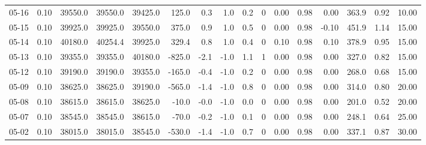 \begin{threeparttable}
{\begin{tabular}{lrrrrrrrrrrrrrrr}
  05-16 &     0.10 & 39550.0 & 39550.0 & 39425.0 &      125.0 &            0.3 &                      1.0 &                 0.2 &              0 &       0.00 &      0.98 &           0.00 &            363.9 &            0.92 &                  10.00 \\
  05-15 &     0.10 & 39925.0 & 39925.0 & 39550.0 &      375.0 &            0.9 &                      1.0 &                 0.5 &              0 &       0.00 &      0.98 &          -0.10 &            451.9 &            1.14 &                  15.00 \\
  05-14 &     0.10 & 40180.0 & 40254.4 & 39925.0 &      329.4 &            0.8 &                      1.0 &                 0.4 &              0 &       0.10 &      0.98 &           0.10 &            378.9 &            0.95 &                  15.00 \\
  05-13 &     0.10 & 39355.0 & 39355.0 & 40180.0 &     -825.0 &           -2.1 &                     -1.0 &                 1.1 &              1 &       0.00 &      0.98 &           0.00 &            327.0 &            0.82 &                  15.00 \\
  05-12 &     0.10 & 39190.0 & 39190.0 & 39355.0 &     -165.0 &           -0.4 &                     -1.0 &                 0.2 &              0 &       0.00 &      0.98 &           0.00 &            268.0 &            0.68 &                  15.00 \\
  05-09 &     0.10 & 38625.0 & 38625.0 & 39190.0 &     -565.0 &           -1.4 &                     -1.0 &                 0.8 &              0 &       0.00 &      0.98 &           0.00 &            314.0 &            0.80 &                  20.00 \\
  05-08 &     0.10 & 38615.0 & 38615.0 & 38625.0 &      -10.0 &           -0.0 &                     -1.0 &                 0.0 &              0 &       0.00 &      0.98 &           0.00 &            201.0 &            0.52 &                  20.00 \\
  05-07 &     0.10 & 38545.0 & 38545.0 & 38615.0 &      -70.0 &           -0.2 &                     -1.0 &                 0.1 &              0 &       0.00 &      0.98 &           0.00 &            248.1 &            0.64 &                  25.00 \\
  05-02 &     0.10 & 38015.0 & 38015.0 & 38545.0 &     -530.0 &           -1.4 &                     -1.0 &                 0.7 &              0 &       0.00 &      0.98 &           0.00 &            337.1 &            0.87 &                  30.00 \\

\end{tabular}}
\end{threeparttable}
